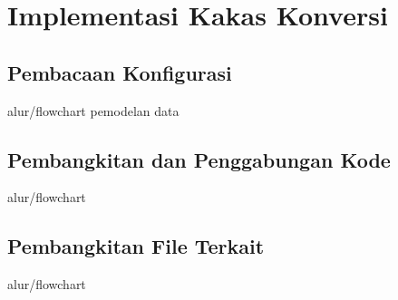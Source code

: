 \section{Implementasi Kakas Konversi}

\subsection{Pembacaan Konfigurasi}

alur/flowchart
pemodelan data

\subsection{Pembangkitan dan Penggabungan Kode}

alur/flowchart


\subsection{Pembangkitan File Terkait}

alur/flowchart

